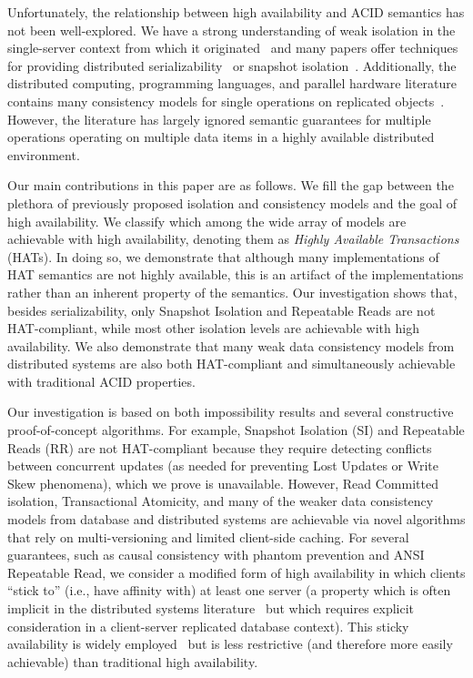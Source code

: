 Unfortunately, the relationship between high availability and ACID
semantics has not been well-explored. We have a strong understanding
of weak isolation in the single-server context from which it
originated~\cite{adya, ansicritique, gray-isolation} and many papers
offer techniques for providing distributed
serializability~\cite{bernstein-book, spanner, daudjee-session,
  hstore, krikellas-bargain, calvin, kemme-classification} or snapshot
isolation~\cite{daudjee-snapshot,generalizedsnapshot, kemme-snapshot,
  walter}. Additionally, the distributed computing, programming
languages, and parallel hardware literature contains many
consistency models for single operations on replicated objects~\cite{
  ceri-mechanism, chen-mechanism, pnuts, herlihy-art, eiger, cac,
  sessionguarantees}. However, the literature has largely ignored
semantic guarantees for multiple operations operating on multiple data
items in a highly available distributed environment.

Our main contributions in this paper are as follows. We fill the gap
between the plethora of previously proposed isolation and consistency
models and the goal of high availability.  We classify which among the
wide array of models are achievable with high availability, denoting
them as {\em Highly Available Transactions} (HATs). In doing so, we
demonstrate that although many implementations of HAT semantics are
not highly available, this is an artifact of the implementations
rather than an inherent property of the semantics. Our investigation
shows that, besides serializability, only Snapshot Isolation and
Repeatable Reads are not HAT-compliant, while most other isolation
levels are achievable with high availability. We also demonstrate that
many weak data consistency models from distributed systems are also
both HAT-compliant and simultaneously achievable with traditional ACID
properties.

Our investigation is based on both impossibility results and several
constructive proof-of-concept algorithms. For example, Snapshot
Isolation (SI) and Repeatable Reads (RR) are not HAT-compliant because
they require detecting conflicts between concurrent updates (as needed
for preventing Lost Updates or Write Skew phenomena), which we prove
is unavailable. However, Read Committed isolation, Transactional
Atomicity, and many of the weaker data consistency models from
database and distributed systems are achievable via novel algorithms
that rely on multi-versioning and limited client-side caching. For
several guarantees, such as causal consistency with phantom prevention
and ANSI Repeatable Read, we consider a modified form of high
availability in which clients ``stick to'' (i.e., have affinity with)
at least one server (a property which is often implicit in the
distributed systems literature~\cite{herlihy-art, eiger, cac} but
which requires explicit consideration in a client-server replicated
database context). This sticky availability is widely
employed~\cite{eiger, vogels-defs} but is less restrictive (and
therefore more easily achievable) than traditional high availability.

